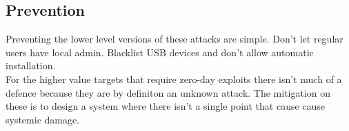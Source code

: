 \subsection{Prevention}
Preventing the lower level versions of these attacks are simple. Don't let regular users have local admin. Blacklist USB devices and don't allow automatic installation.\\
For the higher value targets that require zero-day exploits there isn't much of a defence because they are by definiton an unknown attack. The mitigation on these is to design a system where there isn't a single point that cause cause systemic damage.
